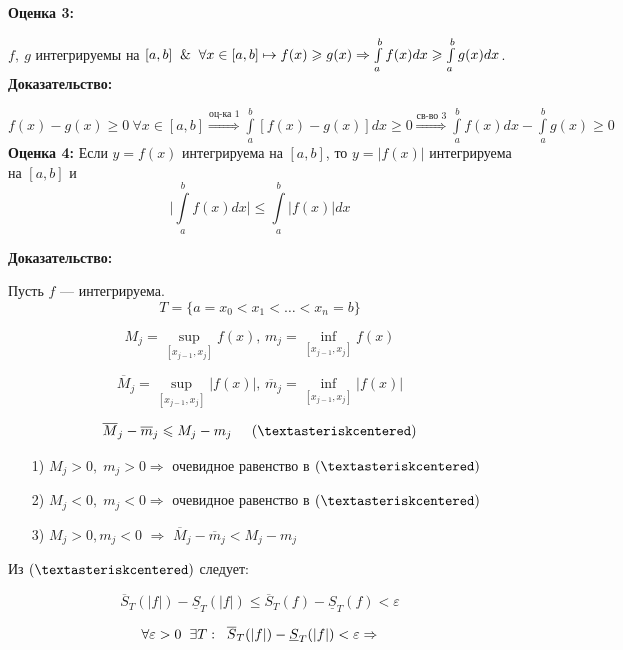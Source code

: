 \documentclass[a4paper,12pt]{article} %
\renewcommand {\geq}{\geqslant}
\renewcommand {\leq}{\leqslant}
\begin{document}
	\textbf{Оценка 3:}
	
	$f,~g$ интегрируемы на $[a,b] \And \forall x \in [a,b]\mapsto f(x)\geq g(x) \Rightarrow\int \limits_a^b f(x) dx \geq \int \limits_a^b g(x) dx$.\\
	
	\textbf{Доказательство:}
	
	$f(x)-g(x) \geq 0 ~\forall x \in [a,b] \stackrel{\text{оц-ка 1}}{\Rightarrow} \int \limits_a^b [f(x)-g(x)]dx\geq 0 \stackrel{\text{св-во 3}}{\Rightarrow}\int \limits_a^b f(x)dx - \int \limits_a^b g(x) \geq 0 $\\[2mm]
	
	\textbf{Оценка 4:}
	Если $ y = f (x) $ интегрируема на $ [a,b] $, то $ y = |f(x)| $ интегрируема на $ [a, b]$ и \vspace*{1mm} \hspace*{50mm} $$\bigg|\int\limits_a^b f(x)dx\bigg| \leq \int\limits_a^b |f(x)|dx $$
	
	\textbf{Доказательство:}
	
	Пусть $f$ --- интегрируема.
	$$ T = \{ a = x_0 < x_1 < \dots < x_n = b \}$$
	
	$$ M_j = \sup\limits_{[x_{j - 1}, x_j]} f(x) \text{, }m_j =  \inf\limits_{[x_{j - 1}, x_j]} f(x) $$
	
	$$ \overline{M}_j = \sup\limits_{[x_{j - 1}, x_j]} |f(x)| \text{, }\overline{m}_j =  \inf\limits_{[x_{j - 1}, x_j]} |f(x)| $$
	
	$$ \overline{M}_j - \overline{m}_j \leq M_j - m_j \hspace*{5mm} ( \textasteriskcentered )$$ 
	
	\begin{enumerate}
		\item [1)] $M_j > 0, \; m_j > 0 \Rightarrow$ очевидное равенство в $ (\textasteriskcentered) $
		\item [2)] $M_j < 0, \; m_j < 0  \Rightarrow$ очевидное равенство в $ (\textasteriskcentered) $
		\item [3)] $ M_j > 0, m_j < 0 $ $\Rightarrow$ $ \overline{M}_j - \overline{m}_j < M_j - m_j $
	\end{enumerate}
	
	Из $ (\textasteriskcentered) $ следует:
	
	$$ \overline{S}_T(|f|) -\underline{S}_T(|f|) \leq \overline{S}_T(f) -\underline{S}_T(f) < \varepsilon$$
	
	$$ \forall \varepsilon > 0 \hspace{2 mm} \exists T: \hspace{2 mm} \overline{S}_T(|f|) -\underline{S}_T(|f|) < \varepsilon \Rightarrow $$
	
\end{document}
